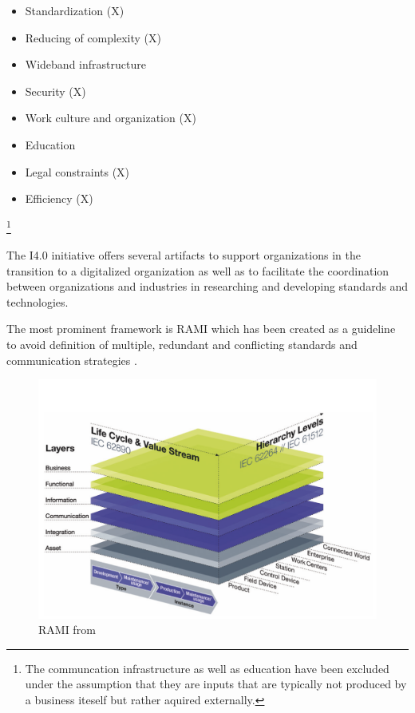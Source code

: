\begin{itemize}
	\item  Standardization (X)
	\item  Reducing of complexity (X)
	\item  Wideband infrastructure
	\item  Security (X)
	\item  Work culture and organization (X)
	\item  Education
	\item  Legal constraints (X)
	\item  Efficiency (X)
\end{itemize}
\cite[p.8]{umsetzungsstrategie:2015}
\footnote{The communcation infrastructure as well as education have been excluded under the assumption that they are inputs that are typically not produced by a business iteself but rather aquired externally.}

The I4.0 initiative offers several artifacts to support organizations in the transition to a digitalized organization as well as to facilitate the coordination between organizations and industries in researching and developing standards and technologies. 

The most prominent framework is \ac{RAMI} which has been created as a guideline to avoid definition of multiple, redundant and conflicting standards and communication strategies \cite[p. 41]{umsetzungsstrategie:2015}.

\begin{figure}[H]
\centering
\includegraphics[width=1\columnwidth]{images/RAMI}
\caption{\ac{RAMI} from \cite{umsetzungsstrategie:2015}}
\end{figure}

